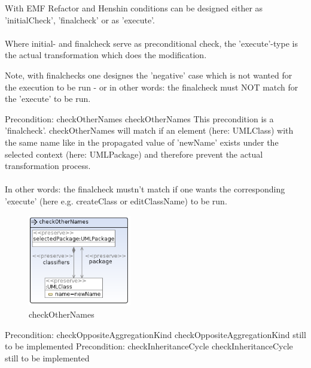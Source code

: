 With EMF Refactor and Henshin conditions can be designed either as
'initialCheck', 'finalcheck' or as 'execute'.
\\\\
Where initial- and finalcheck serve as preconditional check, the 'execute'-type
is the actual transformation which does the modification.

Note, with finalchecks one designes the 'negative' case which is not wanted for
the execution to be run - or in other words: the finalcheck must NOT match for
the 'execute' to be run.

\cond
{Precondition: checkOtherNames}
{checkOtherNames}
{This precondition is a 'finalcheck'. checkOtherNames
will match if an element (here: UMLClass) with the same name like
in the propagated value of 'newName' exists under the selected context (here:
UMLPackage) and therefore prevent the actual transformation process.
\\\\
In other words: the finalcheck mustn't match if one wants the corresponding
'execute' (here e.g. createClass or editClassName) to be run.}

\begin{figure}[H]
  \centering
  \includegraphics[width=0.4\textwidth]{pics/cond_checkOtherNames.png}
  \caption{checkOtherNames}
  \label{checkOtherNames}
\end{figure}
\cond
{Precondition: checkOppositeAggregationKind}
{checkOppositeAggregationKind}
{still to be implemented}
\cond
{Precondition: checkInheritanceCycle}
{checkInheritanceCycle}
{still to be implemented}
